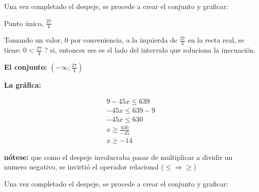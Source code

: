 \documentclass[12pt]{article}
\begin{document}
    Una vez completado el despeje, se procede a crear el conjunto y graficar:

    Punto único, $\displaystyle\frac{27}{4}$

    Tomando un valor, 0 por conveniencia, a la izquierda de $\displaystyle\frac{27}{4}$
    en la recta real,
    se tiene: $\displaystyle0<\frac{27}{4}$ ? si, entonces ese es el lado del intervalo que
    soluciona la inecuación.


    \textbf{El conjunto:} $\displaystyle\left(-\infty; \frac{27}{4}\right)$

    \textbf{La gráfica:}

    \vspace*{1cm}


    \begin{align*}
        9-45x \leq 639 		\\
        -45x \leq 639-9 \\
        -45x \leq 630 \\
        x \geq \frac{630}{-45} \\
        x \geq -14
    \end{align*}

    \textbf{nótese:} que como el despeje involucraba pasar de multiplicar a
    dividir un numero negativo, se invirtió el operador relacional ($\leq \Rightarrow \geq$)

    Una vez completado el despeje, se procede a crear el conjunto y graficar:
\end{document}
